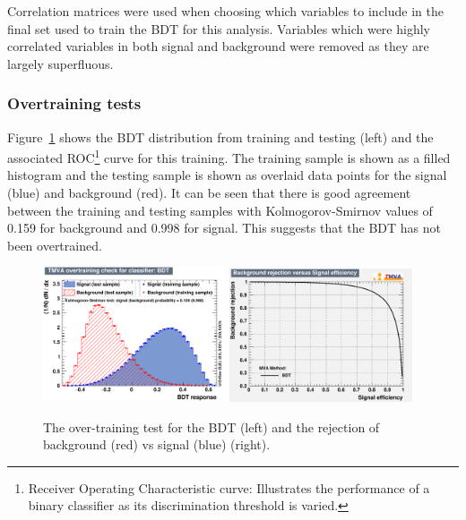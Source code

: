 Correlation matrices were used when choosing which variables to include in the final set used to train the BDT for this analysis. Variables which were highly correlated variables in both signal and background were removed as they are largely superfluous.

\subsubsection{Overtraining tests}

Figure~\ref{fig:ROC} shows the BDT distribution from training and testing (left) and the associated ROC\footnote{Receiver Operating Characteristic curve: Illustrates the performance of a binary classifier as its discrimination threshold is varied.} curve for this training. The training sample is shown as a filled histogram and the testing sample is shown as overlaid data points for the signal \tttt (blue) and background \ttbar (red). It can be seen that there is good agreement between the training and testing samples with Kolmogorov-Smirnov values of 0.159 for background and 0.998 for signal. This suggests that the BDT has not been overtrained.

\begin{figure}
    \includegraphics[width=0.48\textwidth]{images/Run2/overtrain_BDTEL.pdf}
    \includegraphics[width=0.48\textwidth]{images/Run2/rejBvsS.pdf}
    \caption{The over-training test for the BDT (left) and the rejection of background \ttbar (red) vs signal \tttt (blue) (right).}
    \label{fig:ROC}
\end{figure}


